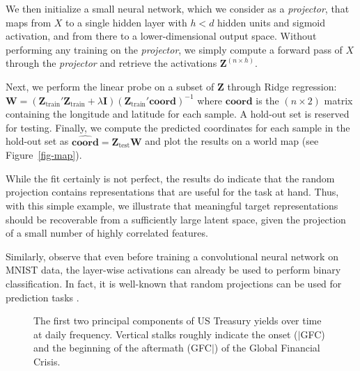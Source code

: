 \documentclass{article}
\theoremstyle{plain}
\theoremstyle{definition}
\theoremstyle{remark}
\begin{document}
We then initialize a small neural network, which we consider as a \emph{projector}, that maps from \(X\) to a single hidden layer with \(h<d\) hidden units and sigmoid activation, and from there to a lower-dimensional output space. Without performing any training on the \emph{projector}, we simply compute a forward pass of \(X\) through the \emph{projector} and retrieve the activations \(\mathbf{Z}^{(n\times h)}\).

Next, we perform the linear probe on a subset of \(\mathbf{Z}\) through Ridge regression: \(\mathbf{W} = (\mathbf{Z}_{\text{train}}'\mathbf{Z}_{\text{train}} + \lambda \mathbf{I}) (\mathbf{Z}_{\text{train}}'\textbf{coord})^{-1}\) where \(\textbf{coord}\) is the \((n \times 2)\) matrix containing the longitude and latitude for each sample. A hold-out set is reserved for testing. Finally, we compute the predicted coordinates for each sample in the hold-out set as \(\widehat{\textbf{coord}}=\mathbf{Z}_{\text{test}}\mathbf{W}\) and plot the results on a world map (see Figure~\ref{fig-map}).  

While the fit certainly is not perfect, the results do indicate that the random projection contains representations that are useful for the task at hand. Thus, with this simple example, we illustrate that meaningful target representations should be recoverable from a sufficiently large latent space, given the projection of a small number of highly correlated features. 

Similarly, \citet{alain2018understanding} observe that even before training a convolutional neural network on MNIST data, the layer-wise activations can already be used to perform binary classification. In fact, it is well-known that random projections can be used for prediction tasks \cite{dasgupta2013experiments}.

\begin{figure}[htp]


\caption{\label{fig-pca}The first two principal components of US Treasury yields over time at daily frequency. Vertical stalks roughly indicate the onset ($|$GFC) and the beginning of the aftermath (GFC$|$) of the Global Financial Crisis.}

\end{figure}
\end{document}
